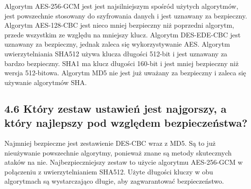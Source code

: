 \documentclass{article}
\begin{document}
Algorytm AES-256-GCM jest jest najsilniejszym spośród użytych algorytmów, jest powszechnie stosowany do szyfrowania danych i jest uznawany za bezpieczny. Algorytm
AES-128-CBC jest nieco mniej bezpieczny niż poprzedni algorytm, przede wszystkim ze względu na mniejszy klucz. Algorytm DES-EDE-CBC jest uznawany za bezpieczny, jednak zaleca się wykorzystywanie AES.
Algorytm uwierzytelniania SHA512 używa klucza długości 512-bit i jest uznawany za bardzo bezpieczny. SHA1 ma klucz długości 160-bit i jest mniej bezpieczny niż wersja 512-bitowa. Algorytm MD5 nie jest już uważany za bezpieczny i zaleca się używanie algorytmów SHA.


\subsection*{4.6 Który zestaw ustawień jest najgorszy, a który najlepszy pod względem
  bezpieczeństwa?}

Najmniej bezpieczne jest zestawienie DES-CBC wraz z MD5. Są to już nieużywanie powszechnie algorytmy, ponieważ znane są metody skutecznych ataków na nie.
Najbezpieczniejszy zestaw to użycie algorytmu AES-256-GCM w połączeniu z uwierzytelnianiem SHA512. Użyte długości kluczy w obu algorytmach są wystarczająco długie, aby zagwarantować bezpieczeństwo.
\end{document}
